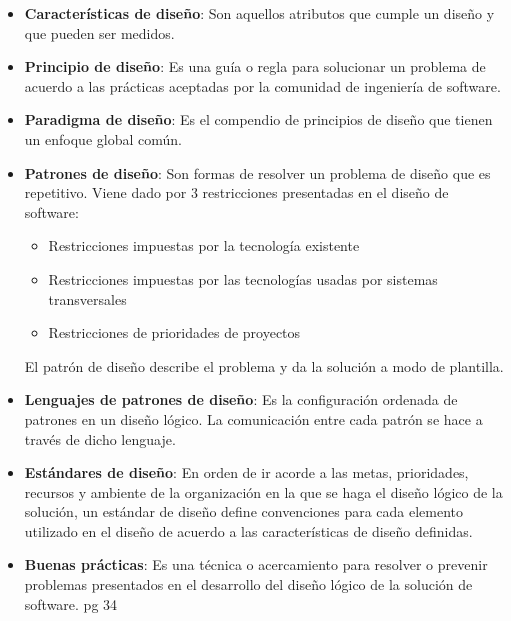 \begin{itemize}
  \item \textbf{Características de diseño}: Son aquellos atributos que cumple un diseño y que pueden ser medidos.
  \item \textbf{Principio de diseño}: Es una guía o regla para solucionar un problema de acuerdo a las prácticas aceptadas por la comunidad de ingeniería de software.
  \item \textbf{Paradigma de diseño}: Es el compendio de principios de diseño que tienen un enfoque global común.
  \item \textbf{Patrones de diseño}: Son formas de resolver un problema de diseño que es repetitivo. Viene dado por 3 restricciones presentadas en el diseño de software:
  \begin{itemize}
    \item Restricciones impuestas por la tecnología existente
    \item Restricciones impuestas por las tecnologías usadas por sistemas transversales
    \item Restricciones de prioridades de proyectos
  \end{itemize}
  El patrón de diseño describe el problema y da la solución a modo de plantilla.
  \item \textbf{Lenguajes de patrones de diseño}: Es la configuración ordenada de patrones en un diseño lógico. La comunicación entre cada patrón se hace a través de dicho lenguaje.
  \item \textbf{Estándares de diseño}: En orden de ir acorde a las metas, prioridades, recursos y ambiente de la organización en la que se haga el diseño lógico de la solución, un estándar de diseño define convenciones para cada elemento utilizado en el diseño de acuerdo a las características de diseño definidas.
  \item \textbf{Buenas prácticas}: Es una técnica o acercamiento para resolver o prevenir problemas presentados en el desarrollo del diseño lógico de la solución de software. pg 34
\end{itemize}


